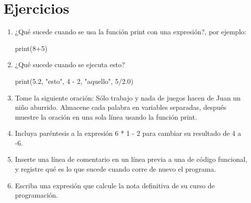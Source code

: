 \begin{description}
   
  
  
   
  
\end{description}

\section{Ejercicios}
\begin{enumerate}
\item ¿Qué sucede cuando se usa la función print con una expresión?, por
ejemplo: 
\begin{pythoncode}
print(8+5)
\end{pythoncode}
\item ¿Qué sucede cuando se ejecuta esto?
\begin{pythoncode}
print(5.2, "esto", 4 - 2, "aquello", 5/2.0)
\end{pythoncode}
\item Tome la siguiente oración: Sólo trabajo y nada de juegos hacen de
Juan un niño aburrido. Almacene cada palabra en variables separadas,
después muestre la oración en una sola línea usando la función print.
\item Incluya paréntesis a la expresión 6 {*} 1 - 2 para cambiar su resultado
de 4 a -6.
\item Inserte una línea de comentario en un línea previa a una de código
funcional, y registre qué es lo que sucede cuando corre de nuevo el
programa.
%
\item Escriba una expresión que calcule la nota definitiva de su curso de
programación.
\end{enumerate}
